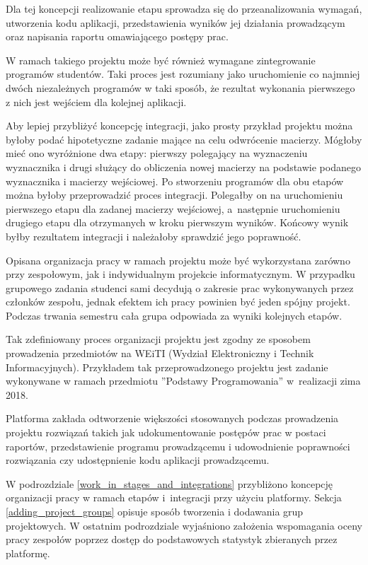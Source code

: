Dla tej koncepcji realizowanie etapu sprowadza się do przeanalizowania wymagań, utworzenia kodu aplikacji, przedstawienia wyników jej działania prowadzącym oraz napisania raportu omawiającego postępy prac.

W ramach takiego projektu może być również wymagane zintegrowanie programów studentów.
Taki proces jest rozumiany jako uruchomienie co najmniej dwóch niezależnych programów w taki sposób, że rezultat wykonania pierwszego z nich jest wejściem dla kolejnej aplikacji.

Aby lepiej przybliżyć koncepcję integracji, jako prosty przykład projektu można byłoby podać hipotetyczne zadanie mające na celu odwrócenie macierzy.
Mógłoby mieć ono wyróżnione dwa etapy: pierwszy polegający na wyznaczeniu wyznacznika i drugi służący do obliczenia nowej macierzy na podstawie podanego wyznacznika i macierzy wejściowej.
Po stworzeniu programów dla obu etapów można byłoby przeprowadzić proces integracji.
Polegałby on na uruchomieniu pierwszego etapu dla zadanej macierzy wejściowej, a~następnie uruchomieniu drugiego etapu dla otrzymanych w kroku pierwszym wyników.
Końcowy wynik byłby rezultatem integracji i należałoby sprawdzić jego poprawność.

Opisana organizacja pracy w ramach projektu może być wykorzystana zarówno przy zespołowym, jak i indywidualnym projekcie informatycznym.
W przypadku grupowego zadania studenci sami decydują o zakresie prac wykonywanych przez członków zespołu, jednak efektem ich pracy powinien być jeden spójny projekt.
Podczas trwania semestru cała grupa odpowiada za wyniki kolejnych etapów.

Tak zdefiniowany proces organizacji projektu jest zgodny ze sposobem prowadzenia przedmiotów na WEiTI (Wydział Elektroniczny i Technik Informacyjnych).
Przykładem tak przeprowadzonego projektu jest zadanie wykonywane w ramach przedmiotu ”Podstawy Programowania” w~realizacji zima 2018.

Platforma zakłada odtworzenie większości stosowanych podczas prowadzenia projektu rozwiązań takich jak udokumentowanie postępów prac w postaci raportów, przedstawienie programu prowadzącemu i udowodnienie poprawności rozwiązania czy udostępnienie kodu aplikacji prowadzącemu.

W podrozdziale \ref{work_in_stages_and_integrations} przybliżono koncepcję organizacji pracy w ramach etapów i~integracji przy użyciu platformy.
Sekcja \ref{adding_project_groups} opisuje sposób tworzenia i dodawania grup projektowych.
W ostatnim podrozdziale wyjaśniono założenia wspomagania oceny pracy zespołów poprzez dostęp do podstawowych statystyk zbieranych przez platformę.


